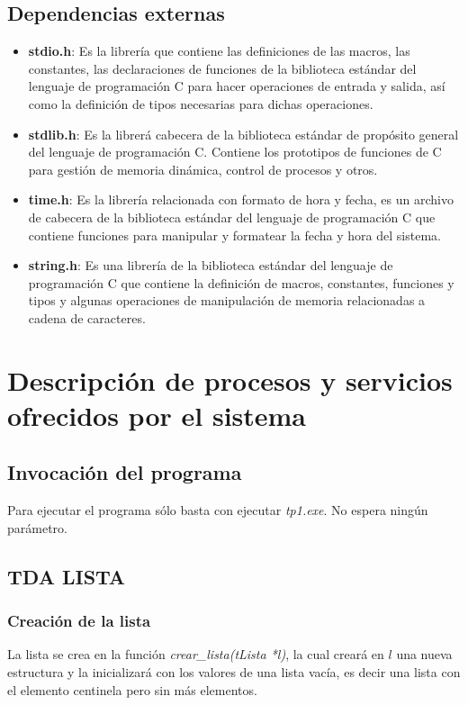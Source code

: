\documentclass[12pt,a4paper]{article}
\begin{document}
\subsection{Dependencias externas}
\begin{itemize}
    \item {\bf stdio.h}: Es la librer\'ia que contiene las definiciones de las macros, las constantes, las declaraciones de funciones de la biblioteca est\'andar del lenguaje de programaci\'on C para hacer operaciones de entrada y salida, as\'i como la definici\'on de tipos necesarias para dichas operaciones.
    \item {\bf stdlib.h}: Es la librer\'a cabecera de la biblioteca est\'andar de prop\'osito general del lenguaje de programaci\'on C. Contiene los prototipos de funciones de C para gesti\'on de memoria din\'amica, control de procesos y otros.
    \item {\bf time.h}: Es la librer\'ia relacionada con formato de hora y fecha, es un archivo de cabecera de la biblioteca est\'andar del lenguaje de programaci\'on C que contiene funciones para manipular y formatear la fecha y hora del sistema.
    \item {\bf string.h}: Es una librer\'ia de la biblioteca est\'andar del lenguaje de programaci\'on C que contiene la definici\'on de macros, constantes, funciones y tipos y algunas operaciones de manipulaci\'on de memoria relacionadas a cadena de caracteres.
\end{itemize}

\section{Descripci\'on de procesos y servicios ofrecidos por el sistema}
\subsection{Invocaci\'on del programa}
Para ejecutar el programa s\'olo basta con ejecutar \emph{tp1.exe}. No espera ning\'un par\'ametro.

\subsection{TDA LISTA}
\subsubsection{Creaci\'on de la lista}
La lista se crea en la funci\'on \emph{crear\_lista(tLista *l)}, la cual crear\'a en $l$ una nueva estructura y la inicializar\'a con los valores de una lista vac\'ia, es decir una lista con el elemento centinela pero sin m\'as elementos.
\end{document}
